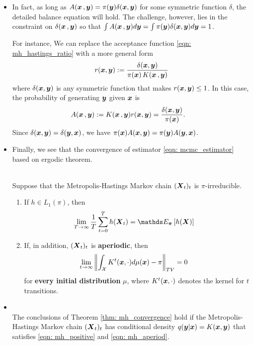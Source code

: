 \documentclass[11pt]{article}
\begin{document}
\begin{itemize}
\item In fact, as long as $A(\boldsymbol{x}\,, \boldsymbol{y}) = \pi(\boldsymbol{y}) \delta(\boldsymbol{x}, \boldsymbol{y})$ for some symmetric function $\delta$, the detailed balance equation will hold. The challenge, however, lies in the constraint on $\delta(\boldsymbol{x}\,, \boldsymbol{y})$ so that $\int A(\boldsymbol{x}\,, \boldsymbol{y}) d\boldsymbol{y} = \int \pi(\boldsymbol{y}) \delta(\boldsymbol{x}, \boldsymbol{y}) d\boldsymbol{y} = 1$.

For instance, We can replace the acceptance function \eqref{eqn: mh_hastings_ratio} with a more general form
\begin{align*}
r(\boldsymbol{x}, \boldsymbol{y}):= \frac{\delta(\boldsymbol{x}, \boldsymbol{y})}{\pi(\boldsymbol{x})\,K(\boldsymbol{x}\,, \boldsymbol{y})}
\end{align*} where $\delta(\boldsymbol{x}, \boldsymbol{y})$ is any symmetric function that makes $r(\boldsymbol{x}, \boldsymbol{y}) \le 1$. In this case, the probability of generating $\boldsymbol{y}$ given $\boldsymbol{x}$ is
\begin{align*}
A(\boldsymbol{x}\,, \boldsymbol{y}):=K(\boldsymbol{x}\,, \boldsymbol{y})r(\boldsymbol{x}, \boldsymbol{y}) &= \frac{\delta(\boldsymbol{x}, \boldsymbol{y})}{\pi(\boldsymbol{x})}.
\end{align*} Since $\delta(\boldsymbol{x}, \boldsymbol{y}) = \delta( \boldsymbol{y}, \boldsymbol{x})$, we have $\pi(\boldsymbol{x})A(\boldsymbol{x}, \boldsymbol{y}) = \pi(\boldsymbol{y})A(\boldsymbol{y}, \boldsymbol{x})$. 

\item Finally, we see that the convergence of estimator \eqref{eqn: mcmc_estimator} based on ergodic theorem.
\begin{theorem}\label{thm: mh_convergence}\citep{robert1999monte}\\
Suppose that the Metropolis-Hastings Markov chain $(\boldsymbol{X}_t)_t$ is $\pi$-irreducible. 
\begin{enumerate}
\item If $h \in L_1(\pi)$, then 
\begin{align}
\lim_{T\rightarrow \infty}\frac{1}{T}\sum_{t=0}^{T}h(\mb{X}_t) &= \E{\mb{\pi}}{h(\mb{X})} \label{eqn: mh_convergence}
\end{align}

\item If, in addition, $(\boldsymbol{X}_t)_t$ is \textbf{aperiodic}, then 
\begin{align}
\lim_{t\rightarrow \infty}\left\|\int_{{\mathcal X}}K^{t}(\boldsymbol{x},\cdot)d\mu(\boldsymbol{x}) - \pi \right\|_{TV} &= 0  \label{eqn: mh_convergence_total_variation}
\end{align} for \textbf{every initial distribution} $\mu$, where $K^{t}(\boldsymbol{x},\cdot)$ denotes the kernel for $t$ transitions.
\end{enumerate}
\end{theorem}

\item \begin{corollary}\citep{robert1999monte}\\
The conclusions of Theorem \ref{thm: mh_convergence} hold if the Metropolis-Hastings Markov chain $(\boldsymbol{X}_t)_t$ has conditional density 
$q(\boldsymbol{y}|\boldsymbol{x}) = K(\boldsymbol{x}, \boldsymbol{y})$ that satisfies \eqref{eqn: mh_positive} and \eqref{eqn: mh_aperiod}. 
\end{corollary}
\end{itemize}
\end{document}
